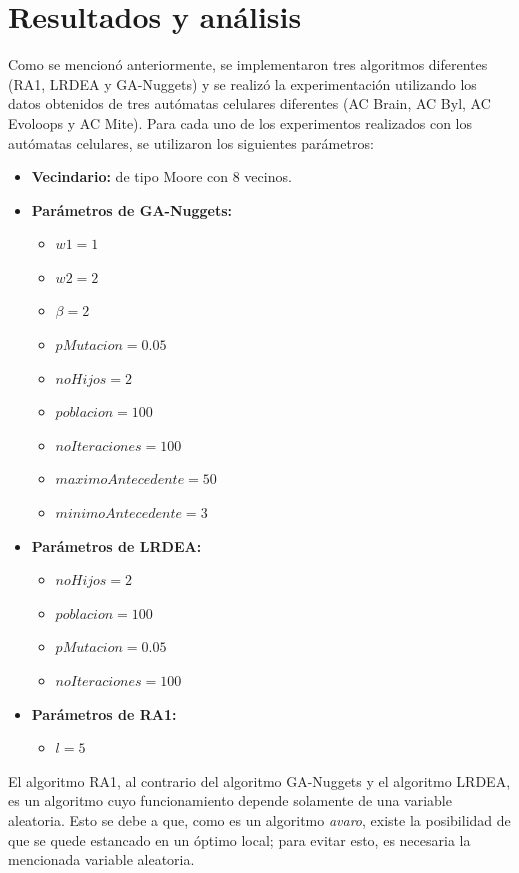 \chapter{Resultados y análisis}

Como se mencionó anteriormente, se implementaron tres algoritmos diferentes (RA1, LRDEA y GA-Nuggets) y se realizó la experimentación utilizando los datos obtenidos de tres autómatas celulares diferentes (AC Brain, AC Byl, AC Evoloops y AC Mite). Para cada uno de los experimentos realizados con los autómatas celulares, se utilizaron los siguientes parámetros:
\\
\begin{itemize}
	\item \textbf{Vecindario:} de tipo Moore con 8 vecinos.
	\item \textbf{Parámetros de GA-Nuggets:}
	\begin{itemize}
		\item $w1=1$ 
		\item $w2=2$ 
		\item $\beta=2$ 
		\item $pMutacion=0.05$
		\item $noHijos=2$ 
		\item $poblacion=100$ 
		\item $noIteraciones=100$
		\item $maximoAntecedente=50$
		\item $minimoAntecedente=3$
	\end{itemize}
	\item \textbf{Parámetros de LRDEA:}
	\begin{itemize}
		\item $noHijos=2$
		\item $poblacion=100$
		\item $pMutacion=0.05$
		\item $noIteraciones=100$
	\end{itemize}
	\item \textbf{Parámetros de RA1:}
	\begin{itemize}
		\item $l=5$
	\end{itemize}
\end{itemize}

El algoritmo RA1, al contrario del algoritmo GA-Nuggets y el algoritmo LRDEA, es un algoritmo cuyo funcionamiento depende solamente de una variable aleatoria. Esto se debe a que, como es un algoritmo \emph{avaro}, existe la posibilidad de que se quede estancado en un óptimo local; para evitar esto, es necesaria la mencionada variable aleatoria.
\\

